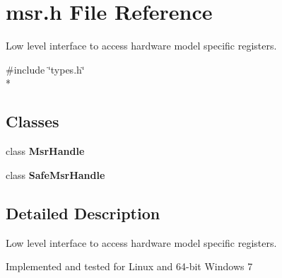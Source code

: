 \section{msr.\+h File Reference}
\label{msr_8h}


Low level interface to access hardware model specific registers.  


{\ttfamily \#include \char`\"{}types.\+h\char`\"{}}\\*
\subsection*{Classes}
\begin{DoxyCompactItemize}
\item 
class {\bf Msr\+Handle}
\item 
class {\bf Safe\+Msr\+Handle}
\end{DoxyCompactItemize}


\subsection{Detailed Description}
Low level interface to access hardware model specific registers. 

Implemented and tested for Linux and 64-\/bit Windows 7 